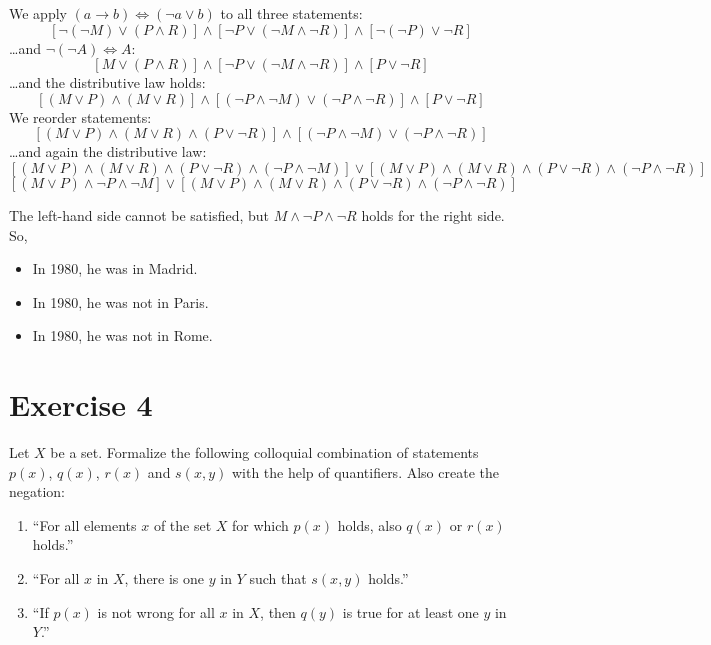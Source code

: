 \documentclass[a4paper]{article}
\theoremstyle{definition}
\begin{document}
We apply $(a \rightarrow b) \Leftrightarrow (\neg a \lor b)$ to all three statements:
\[
    \left[\neg(\neg M) \lor (P \land R)\right] \land
    \left[\neg P \lor (\neg M \land \neg R)\right] \land
    \left[\neg(\neg P) \lor \neg R\right]
\]
\dots and $\neg(\neg A) \Leftrightarrow A$:
\[
    \left[M \lor (P \land R)\right] \land
    \left[\neg P \lor (\neg M \land \neg R)\right] \land
    \left[P \lor \neg R\right]
\]
\dots and the distributive law holds:
\[
    \left[(M \lor P) \land (M \lor R)\right] \land
    \left[(\neg P \land \neg M) \lor (\neg P \land \neg R)\right] \land
    \left[P \lor \neg R\right]
\]
We reorder statements:
\[
    \left[(M \lor P) \land (M \lor R) \land (P \lor \neg R)\right] \land
    \left[(\neg P \land \neg M) \lor (\neg P \land \neg R)\right]
\]
\dots and again the distributive law:
\[
    \left[(M \lor P) \land (M \lor R) \land (P \lor \neg R) \land (\neg P \land \neg M)\right] \lor
    \left[(M \lor P) \land (M \lor R) \land (P \lor \neg R) \land (\neg P \land \neg R)\right]
\]
\[
    \left[(M \lor P) \land \neg P \land \neg M\right] \lor
    \left[(M \lor P) \land (M \lor R) \land (P \lor \neg R) \land (\neg P \land \neg R)\right]
\]

The left-hand side cannot be satisfied, but $M \land \neg P \land \neg R$ holds for the right side.
So,
\begin{itemize}
  \item In 1980, he was in Madrid.
  \item In 1980, he was not in Paris.
  \item In 1980, he was not in Rome.
\end{itemize}

\section{Exercise 4}
\begin{ex}
  Let $X$ be a set. Formalize the following colloquial combination of statements
  $p(x)$, $q(x)$, $r(x)$ and $s(x, y)$ with the help of quantifiers. Also create
  the negation:
  \begin{enumerate}
    \item \enquote{For all elements $x$ of the set $X$ for which $p(x)$ holds, also $q(x)$ or $r(x)$ holds.}
    \item \enquote{For all $x$ in $X$, there is one $y$ in $Y$ such that $s(x,y)$ holds.}
    \item \enquote{If $p(x)$ is not wrong for all $x$ in $X$, then $q(y)$ is true for at least one $y$ in $Y$.}
  \end{enumerate}
\end{ex}
\end{document}
